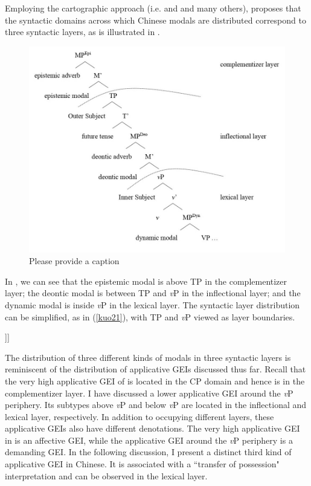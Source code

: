 \documentclass[output=paper,colorlinks,citecolor=brown]{langscibook}
\begin{document}
Employing the cartographic approach (i.e. \citealt{rizzi1997} and \citealt{cinque1999} and many others), \citet{Tsai2015a} proposes that the syntactic domains across which Chinese modals are distributed correspond to three syntactic layers, as is illustrated in .

\begin{figure}
\caption{\color{red}Please provide a caption\label{kuo20}}
\includegraphics[align=t,width=11.5cm]{figures/tree2.jpg}
\end{figure}

In , we can see that the epistemic modal is above TP in the complementizer layer; the deontic modal is between TP and \textit{v}P in the inflectional layer; and the dynamic modal is inside \textit{v}P in the lexical layer. The syntactic layer distribution can be simplified, as in (\ref{kuo21}), with TP and \textit{v}P viewed as layer boundaries.

\ea
\label{kuo21}
\glt    [ complementizer layer  [\textsubscript{TP}    inflectional layer  [\textsubscript{\textit{v}P}   lexical layer .....]]]\\  
\z

The distribution of three different kinds of modals in three syntactic layers is reminiscent of the distribution of applicative GEIs discussed thus far. Recall that the very high applicative GEI of  \citet{Tsai2017} is located in the CP domain and hence is in the complementizer layer. I have discussed a lower applicative GEI around the \textit{v}P periphery. Its subtypes above \textit{v}P and below \textit{v}P are located in the inflectional and lexical layer, respectively. In addition to occupying different layers, these applicative GEIs also have different denotations. The very high applicative GEI in \citet{Tsai2017} is an affective GEI, while the applicative GEI around the \textit{v}P periphery is a demanding GEI. In the following discussion, I present a distinct third kind of applicative GEI in Chinese. It is associated with a “transfer of possession" interpretation and can be observed in the lexical layer.
\end{document}
